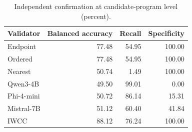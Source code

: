 \begin{table}[t]
\centering
\caption{Independent confirmation at candidate-program level (percent).}
\label{tab:main}
\begin{tabular}{lrrr}
\toprule
Validator & Balanced accuracy & Recall & Specificity \\
\midrule
Endpoint & 77.48 & 54.95 & 100.00 \\
Ordered & 77.48 & 54.95 & 100.00 \\
Nearest & 50.74 & 1.49 & 100.00 \\
Qwen3-4B & 49.50 & 99.01 & 0.00 \\
Phi-4-mini & 50.72 & 86.14 & 15.31 \\
Mistral-7B & 51.12 & 60.40 & 41.84 \\
IWCC & 88.12 & 76.24 & 100.00 \\
\bottomrule
\end{tabular}
\end{table}
